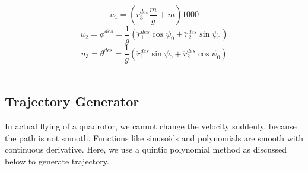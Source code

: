\begin{equation}
u_1 =(\ddot r^{des}_3 \frac{m}{g}+ m)1000
\end{equation}
\begin{equation}
u_2 = \phi^{des} = \frac{1}{g}(\ddot r^{des}_1 \cos \psi_0 + \ddot r^{des}_2 \sin \psi_0 )
\end{equation}
\begin{equation}
u_3 = \theta^{des} = \frac{1}{g}(\ddot r^{des}_1 \sin \psi_0 + \ddot r^{des}_2 \cos \psi_0 )
\end{equation}
\\

\subsection{Trajectory Generator}
In actual flying of a quadrotor, we cannot change the velocity suddenly, because the path is not smooth. Functions like sinusoids and polynomials are smooth with continuous derivative. Here, we use a quintic polynomial method as discussed below to generate trajectory.\\

